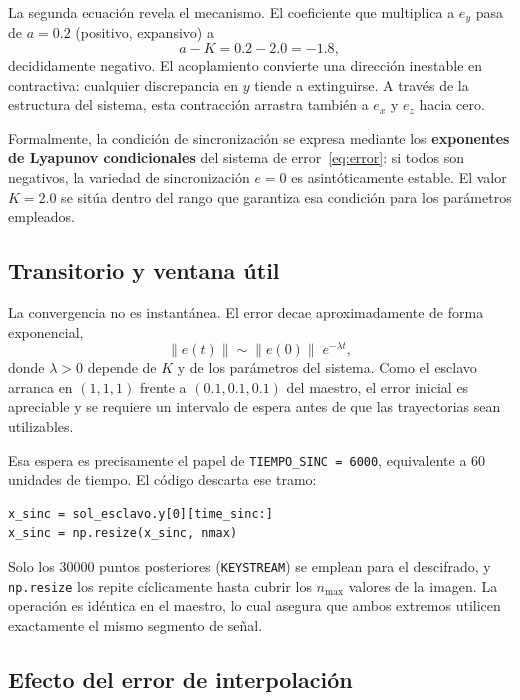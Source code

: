 \documentclass[12pt,a4paper]{article}
\begin{document}
La segunda ecuación revela el mecanismo. El coeficiente que multiplica a $e_y$ pasa de $a = 0.2$ (positivo, expansivo) a
\begin{equation}
a - K = 0.2 - 2.0 = -1.8,
\end{equation}
decididamente negativo. El acoplamiento convierte una dirección inestable en contractiva: cualquier discrepancia en $y$ tiende a extinguirse. A través de la estructura del sistema, esta contracción arrastra también a $e_x$ y $e_z$ hacia cero.

Formalmente, la condición de sincronización se expresa mediante los \textbf{exponentes de Lyapunov condicionales} del sistema de error~\eqref{eq:error}: si todos son negativos, la variedad de sincronización $e = 0$ es asintóticamente estable. El valor $K = 2.0$ se sitúa dentro del rango que garantiza esa condición para los parámetros empleados.

\subsection{Transitorio y ventana útil}

La convergencia no es instantánea. El error decae aproximadamente de forma exponencial,
\begin{equation}
\|e(t)\| \sim \|e(0)\|\; e^{-\lambda t},
\end{equation}
donde $\lambda > 0$ depende de $K$ y de los parámetros del sistema. Como el esclavo arranca en $(1,1,1)$ frente a $(0.1,0.1,0.1)$ del maestro, el error inicial es apreciable y se requiere un intervalo de espera antes de que las trayectorias sean utilizables.

Esa espera es precisamente el papel de \texttt{TIEMPO\_SINC = 6000}, equivalente a $60$ unidades de tiempo. El código descarta ese tramo:
\begin{lstlisting}
x_sinc = sol_esclavo.y[0][time_sinc:]
x_sinc = np.resize(x_sinc, nmax)
\end{lstlisting}

Solo los $30000$ puntos posteriores (\texttt{KEYSTREAM}) se emplean para el descifrado, y \texttt{np.resize} los repite cíclicamente hasta cubrir los $n_{\max}$ valores de la imagen. La operación es idéntica en el maestro, lo cual asegura que ambos extremos utilicen exactamente el mismo segmento de señal.

\subsection{Efecto del error de interpolación}
\end{document}
